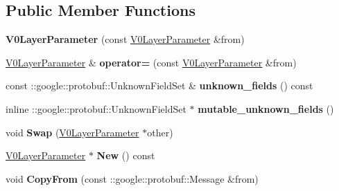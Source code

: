 \subsection*{Public Member Functions}
\begin{DoxyCompactItemize}
\item 
\mbox{\label{classcaffe_1_1_v0_layer_parameter_abe389effb612bfceadc41f5eefade0bd}} 
{\bfseries V0\+Layer\+Parameter} (const \mbox{\hyperlink{classcaffe_1_1_v0_layer_parameter}{V0\+Layer\+Parameter}} \&from)
\item 
\mbox{\label{classcaffe_1_1_v0_layer_parameter_ad077adadfad6e5c23799b6e0b3e7c6d5}} 
\mbox{\hyperlink{classcaffe_1_1_v0_layer_parameter}{V0\+Layer\+Parameter}} \& {\bfseries operator=} (const \mbox{\hyperlink{classcaffe_1_1_v0_layer_parameter}{V0\+Layer\+Parameter}} \&from)
\item 
\mbox{\label{classcaffe_1_1_v0_layer_parameter_a1a7ca01f6dca09db851c8627f7b6cd17}} 
const \+::google\+::protobuf\+::\+Unknown\+Field\+Set \& {\bfseries unknown\+\_\+fields} () const
\item 
\mbox{\label{classcaffe_1_1_v0_layer_parameter_a8f1e196157e0756656c38c31cd9f6be0}} 
inline \+::google\+::protobuf\+::\+Unknown\+Field\+Set $\ast$ {\bfseries mutable\+\_\+unknown\+\_\+fields} ()
\item 
\mbox{\label{classcaffe_1_1_v0_layer_parameter_ace771d565cdf95729b78b260cc89d795}} 
void {\bfseries Swap} (\mbox{\hyperlink{classcaffe_1_1_v0_layer_parameter}{V0\+Layer\+Parameter}} $\ast$other)
\item 
\mbox{\label{classcaffe_1_1_v0_layer_parameter_a9d1b700f17ad0e57c21c2a5ca9503c31}} 
\mbox{\hyperlink{classcaffe_1_1_v0_layer_parameter}{V0\+Layer\+Parameter}} $\ast$ {\bfseries New} () const
\item 
\mbox{\label{classcaffe_1_1_v0_layer_parameter_adf83cf0a36741cad90acc6f7636ad03c}} 
void {\bfseries Copy\+From} (const \+::google\+::protobuf\+::\+Message \&from)
\item 

\end{DoxyCompactItemize}
